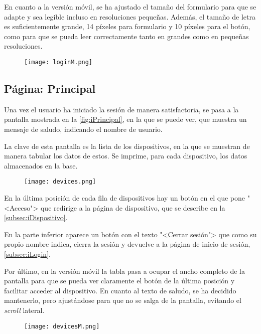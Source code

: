En cuanto a la versión móvil, se ha ajustado el tamaño del formulario para que se adapte y sea legible incluso en resoluciones pequeñas. Además, el tamaño de letra es suficientemente grande, 14 píxeles para formulario y 10 píxeles para el botón, como para que se pueda leer correctamente tanto en grandes como en pequeñas resoluciones.
\begin{figure}[H]
	{\texttt{[image: loginM.png]}}
\end{figure}

\subsection{Página: Principal}\label{subsec:iPrincipal}
Una vez el usuario ha iniciado la sesión de manera satisfactoria, se pasa a la pantalla mostrada en la \autoref{fig:iPrincipal}, en la que se puede ver, que muestra un mensaje de saludo, indicando el nombre de usuario.

La clave de esta pantalla es la lista de los dispositivos, en la que se muestran de manera tabular los datos de estos. Se imprime, para cada dispositivo, los datos almacenados en la base.
\vspace{.5cm}
\begin{figure}[H]
	{\texttt{[image: devices.png]}}
\end{figure}
En la última posición de cada fila de dispositivos hay un botón en el que pone "<Acceso"> que redirige a la página de dispositivo, que se describe en la \autoref{subsec:iDispositivo}.

En la parte inferior aparece un botón con el texto "<Cerrar sesión"> que como su propio nombre indica, cierra la sesión y devuelve a la página de inicio de sesión, \autoref{subsec:iLogin}.

Por último, en la versión móvil la tabla pasa a ocupar el ancho completo de la pantalla para que se pueda ver claramente el botón de la última posición y facilitar acceder al dispositivo. En cuanto al texto de saludo, se ha decidido mantenerlo, pero ajustándose para que no se salga de la pantalla, evitando el \textit{scroll} lateral.
\vspace{.5cm}
\begin{figure}[H]
	{\texttt{[image: devicesM.png]}}
\end{figure}

